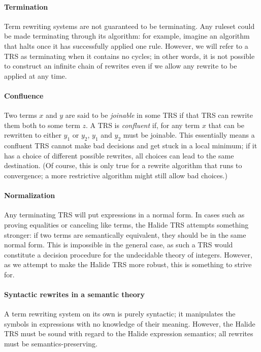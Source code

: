 \documentclass[acmsmall,review]{acmart}\settopmatter{printfolios=true,printccs=false,printacmref=false}
\begin{document}
\paragraph{Termination}
Term rewriting systems are not guaranteed to be terminating. Any ruleset could be made terminating through its algorithm: for example, imagine an algorithm that halts once it has successfully applied one rule. However, we will refer to a TRS as terminating when it contains no cycles; in other words, it is not possible to construct an infinite chain of rewrites even if we allow any rewrite to be applied at any time.

\paragraph{Confluence}
Two terms $x$ and $y$ are said to be \emph{joinable} in some TRS if that TRS can rewrite them both to some term $z$. A TRS is \emph{confluent} if, for any term $x$ that can be rewritten to either $y_1$ or $y_2$, $y_1$ and $y_2$ must be joinable. This essentially means a confluent TRS cannot make bad decisions and get stuck in a local minimum; if it has a choice of different possible rewrites, all choices can lead to the same destination. (Of course, this is only true for a rewrite algorithm that runs to convergence; a more restrictive algorithm might still allow bad choices.)

\paragraph{Normalization}
Any terminating TRS will put expressions in a normal form. In cases such as proving equalities or canceling like terms, the Halide TRS attempts something stronger: if two terms are semantically equivalent, they should be in the same normal form. This is impossible in the general case, as such a TRS would constitute a decision procedure for the undecidable theory of integers. However, as we attempt to make the Halide TRS more robust, this is something to strive for.

\paragraph{Syntactic rewrites in a semantic theory}
A term rewriting system on its own is purely syntactic; it manipulates the symbols in expressions with no knowledge of their meaning. However, the Halide TRS must be sound with regard to the Halide expression semantics; all rewrites must be semantics-preserving. 
\end{document}
